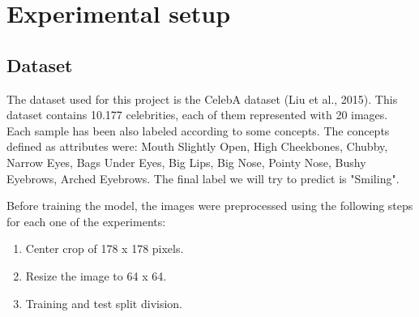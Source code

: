 \documentclass[11pt,a4paper,twocolumn]{article}
\begin{document}







\section{Experimental setup}
\label{sec:methodology}

\subsection{Dataset}

The dataset used for this project is the CelebA dataset (Liu et al., 2015)\cite{Liu_2015_ICCV}. This dataset contains 10.177 celebrities, each of them represented with 20 images. Each sample has been also labeled according to some concepts. The concepts defined as attributes were: Mouth Slightly Open, High Cheekbones, Chubby, Narrow Eyes, Bags Under Eyes, Big Lips, Big Nose, Pointy Nose, Bushy Eyebrows, Arched Eyebrows. The final label we will try to predict is "Smiling".

Before training the model, the images were preprocessed using the following steps for each one of the experiments:

\begin{enumerate}
    \item Center crop of 178 x 178 pixels.
    \item Resize the image to 64 x 64.
    \item Training and test split division.
\end{enumerate}
\end{document}
